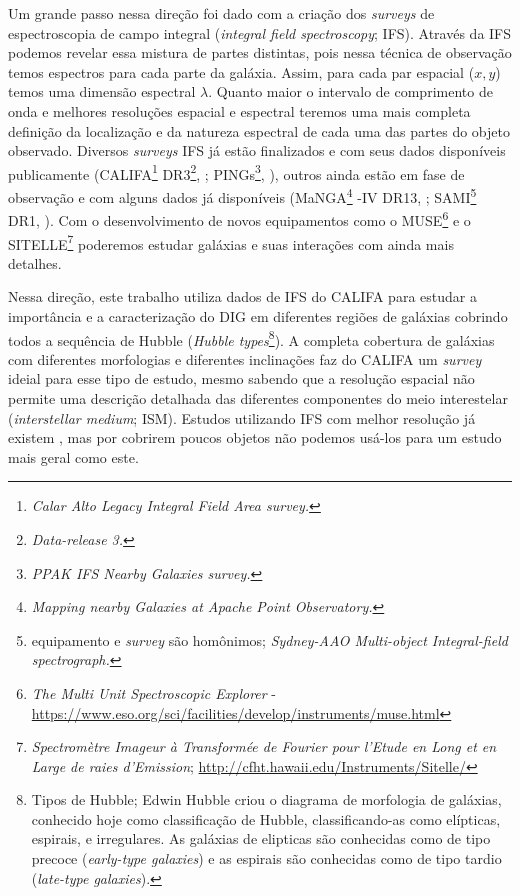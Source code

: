 Um grande passo nessa direção foi dado com a criação dos {\em surveys} de espectroscopia de campo integral ({\em integral field spectroscopy}; IFS). Através da IFS podemos revelar essa mistura de partes distintas, pois nessa técnica de observação temos espectros para cada parte da galáxia. Assim, para cada par espacial ($x,y$) temos uma dimensão espectral $\lambda$. Quanto maior o intervalo de comprimento de onda e melhores resoluções espacial e espectral teremos uma mais completa definição da localização e da natureza espectral de cada uma das partes do objeto observado. Diversos {\em surveys} IFS já estão finalizados e com seus dados disponíveis publicamente (CALIFA\footnote{\em Calar Alto Legacy Integral Field Area survey.} DR3\footnote{\em Data-release 3.}, \citealt{SFSanchez.DR3.2016}; PINGs\footnote{\em PPAK IFS Nearby Galaxies survey.}, \citealt{RosalesOrtega.etal.2010}), outros ainda estão em fase de observação e com alguns dados já disponíveis (MaNGA\footnote{\em Mapping nearby Galaxies at Apache Point Observatory.} \SDSS-IV DR13, \citealt{MaNGADR1.2017}; SAMI\footnote{equipamento e {\em survey} são homônimos; {\em Sydney-AAO Multi-object Integral-field spectrograph.}} DR1, \citealt{SAMIDR1.2017}). Com o desenvolvimento de novos equipamentos como o MUSE\footnote{{\em The Multi Unit Spectroscopic Explorer} - \href{https://www.eso.org/sci/facilities/develop/instruments/muse.html}{https://www.eso.org/sci/facilities/develop/instruments/muse.html}} e o SITELLE\footnote{{\em Spectromètre Imageur à Transformée de Fourier pour l'Etude en Long et en Large de raies d'Emission}; \href{http://cfht.hawaii.edu/Instruments/Sitelle/}{http://cfht.hawaii.edu/Instruments/Sitelle/}} poderemos estudar galáxias e suas interações com ainda mais detalhes.

Nessa direção, este trabalho utiliza dados de IFS do CALIFA para estudar a importância e a caracterização do DIG em diferentes regiões de galáxias cobrindo todos a sequência de Hubble ({\em Hubble types}\footnote{Tipos de Hubble; Edwin Hubble criou o diagrama de morfologia de galáxias, conhecido hoje como classificação de Hubble, classificando-as como elípticas, espirais, e irregulares. As galáxias de elipticas são conhecidas como de tipo precoce ({\em early-type galaxies}) e as espirais são conhecidas como de tipo tardio ({\em late-type galaxies}).}). A completa cobertura de galáxias com diferentes morfologias e diferentes inclinações faz do CALIFA um {\em survey} ideial para esse tipo de estudo, mesmo sabendo que a resolução espacial não permite uma descrição detalhada das diferentes componentes do meio interestelar ({\em interstellar medium}; ISM). Estudos utilizando IFS com melhor resolução já existem \citep{Sanchez.etal.2015MUSE, Vogt.etal.2017a, RousseauNepton.etal.2017}, mas por cobrirem poucos objetos não podemos usá-los para um estudo mais geral como este.


